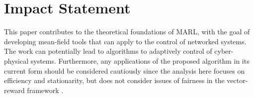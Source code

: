 
\section*{Impact Statement}
This paper contributes to the theoretical foundations of MARL, with the goal of developing mean-field tools that can apply to the control of networked systems. The work can potentially lead to algorithms to adaptively control of cyber-physical systems. Furthermore, any applications of the proposed algorithm in its current form should be considered cautiously since the analysis here focuses on efficiency and stationarity, but does not consider issues of fairness in the vector-reward framework \cite{pmlr-v19-abernethy11b}.


